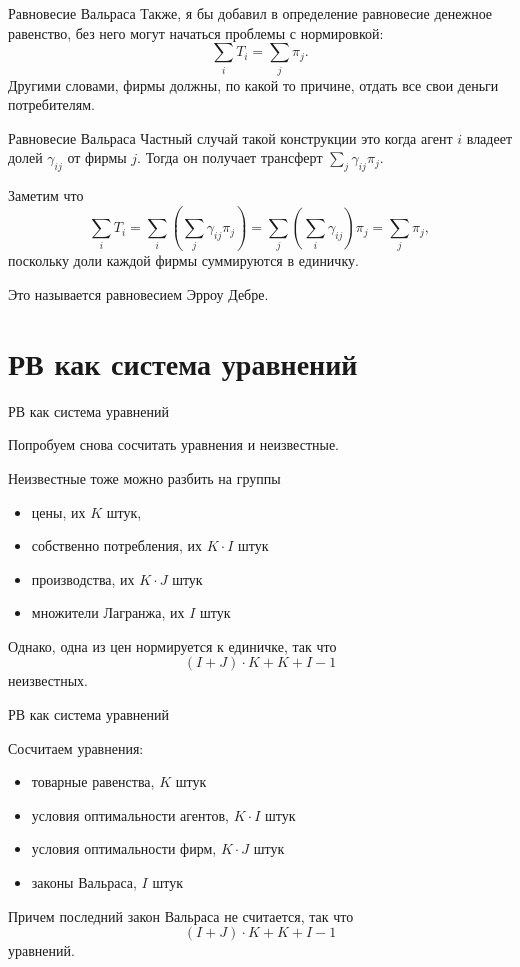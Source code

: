 \documentclass{beamer}
\begin{document}
\begin{frame}{Равновесие Вальраса}
Также, я бы добавил в определение равновесие \alert{денежное равенство}, без него могут начаться проблемы с нормировкой: $$\sum_i T_i = \sum_j \pi_j.$$
Другими словами, фирмы должны, по какой то причине, отдать все свои деньги потребителям.
\end{frame}

\begin{frame}{Равновесие Вальраса}
Частный случай такой конструкции это когда агент $i$ владеет долей $\gamma_{ij}$ от фирмы $j$. Тогда он получает трансферт $\sum_j \gamma_{ij} \pi_j$. 

Заметим что
$$ \sum_i T_i = \sum_i (\sum_j \gamma_{ij} \pi_j) = \sum_j (\sum_i \gamma_{ij}) \pi_j = \sum_j \pi_j,$$
поскольку доли каждой фирмы суммируются в единичку. 

Это называется \alert{равновесием Эрроу Дебре}.
\end{frame}

\section{РВ как система уравнений}

\begin{frame}{РВ как система уравнений}

Попробуем снова сосчитать уравнения и неизвестные.

Неизвестные тоже можно разбить на группы

\begin{itemize}
  \item цены, их $K$ штук,
  \item собственно потребления, их $K \cdot I$ штук
  \item производства, их $K \cdot J$ штук
  \item множители Лагранжа, их $I$ штук
\end{itemize}

Однако, одна из цен нормируется к единичке, так что $$(I +J)\cdot K + K + I - 1$$ неизвестных.

\end{frame}

\begin{frame}{РВ как система уравнений}

Сосчитаем уравнения:

\begin{itemize}
  \item товарные равенства, $K$ штук
  \item условия оптимальности агентов, $K \cdot I$ штук
  \item условия оптимальности фирм, $K \cdot J$ штук
  \item законы Вальраса, $I$ штук
\end{itemize}

Причем последний закон Вальраса не считается, так что $$(I +J)\cdot K + K + I - 1$$ уравнений.

\end{frame}
\end{document}

